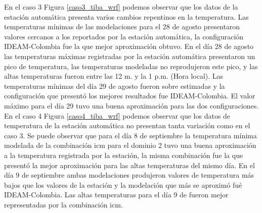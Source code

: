En el caso 3 Figura \ref{caso3_tiba_wrf} podemos observar que los datos de la estación automática presenta varios cambios repentinos en la temperatura. Las temperaturas mínimas de las modelaciones para el 28 de agosto presentaron valores cercanos a los reportados por la estación automática, la configuración IDEAM-Colombia fue la que mejor aproximación obtuvo. En el día 28 de agosto las temperaturas máximas registradas por la estación automática presentaron un pico de temperatura, las temperaturas modeladas no reprodujeron este pico, y las altas temperaturas fueron entre las 12 m. y la 1 p.m. (Hora local). Las temperaturas mínimas del día 29 de agosto fueron sobre estimadas y la configuración que presentó los mejores resultados fue IDEAM-Colombia. El valor máximo para el día 29 tuvo una buena aproximación para las dos configuraciones.\\

En el caso 4 Figura \ref{caso4_tiba_wrf} podemos observar que los datos de temperatura de la estación automática no presentan tanta variación como en el caso 3. Se puede observar que para el día 8 de septiembre la temperatura mínima modelada de la combinación icm para el dominio 2 tuvo una buena aproximación a la temperatura registrada por la estación, la misma combinación fue la que presentó la mejor aproximación para las altas temperaturas del mismo día. En el día 9 de septiembre ambas modelaciones produjeron valores de temperatura más bajos que los valores de la estación y la modelación que más se aproximó fué IDEAM-Colombia. Las altas temperaturas para el día 9 de fueron mejor representadas por la combinación icm.\\

